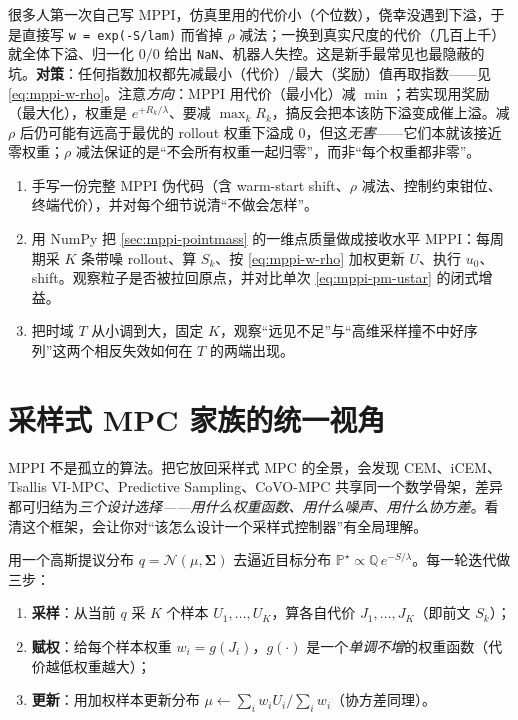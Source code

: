\begin{pitfall}
很多人第一次自己写 MPPI，仿真里用的代价小（个位数），侥幸没遇到下溢，于是直接写 \texttt{w = exp(-S/\allowbreak lam)} 而省掉 $\rho$ 减法；一换到真实尺度的代价（几百上千）就全体下溢、归一化 $0/0$ 给出 \texttt{NaN}、机器人失控。这是新手最常见也最隐蔽的坑。\textbf{对策}：任何指数加权都先减最小（代价）/最大（奖励）值再取指数——见 \cref{eq:mppi-w-rho}。注意\emph{方向}：MPPI 用代价（最小化）减 $\min$；若实现用奖励（最大化），权重是 $e^{+R_k/\lambda}$、要减 $\max_k R_k$，搞反会把本该防下溢变成催上溢。减 $\rho$ 后仍可能有远高于最优的 rollout 权重下溢成 $0$，但这\emph{无害}——它们本就该接近零权重；$\rho$ 减法保证的是“不会所有权重一起归零”，而非“每个权重都非零”。
\end{pitfall}

\begin{practice}
\begin{enumerate}
  \item 手写一份完整 MPPI 伪代码（含 warm-start shift、$\rho$ 减法、控制约束钳位、终端代价），并对每个细节说清“不做会怎样”。
  \item 用 NumPy 把 \cref{sec:mppi-pointmass} 的一维点质量做成接收水平 MPPI：每周期采 $K$ 条带噪 rollout、算 $S_k$、按 \cref{eq:mppi-w-rho} 加权更新 $U$、执行 $u_0$、shift。观察粒子是否被拉回原点，并对比单次 \cref{eq:mppi-pm-ustar} 的闭式增益。
  \item 把时域 $T$ 从小调到大，固定 $K$，观察“远见不足”与“高维采样撞不中好序列”这两个相反失效如何在 $T$ 的两端出现。
\end{enumerate}
\end{practice}

\section{采样式 MPC 家族的统一视角}
\label{sec:mppi-family}

MPPI 不是孤立的算法。把它放回采样式 MPC 的全景，会发现 CEM、iCEM、Tsallis VI-MPC、Predictive Sampling、CoVO-MPC 共享同一个数学骨架，差异都可归结为\emph{三个设计选择——用什么权重函数、用什么噪声、用什么协方差}。看清这个框架，会让你对“该怎么设计一个采样式控制器”有全局理解。

\begin{definition}\label{def:mppi-skeleton}
用一个高斯提议分布 $q=\mathcal{N}(\mu,\boldsymbol{\Sigma})$ 去逼近目标分布 $\mathbb{P}^\star\propto\mathbb{Q}\,e^{-S/\lambda}$。每一轮迭代做三步：
\begin{enumerate}
  \item \textbf{采样}：从当前 $q$ 采 $K$ 个样本 $U_1,\dots,U_K$，算各自代价 $J_1,\dots,J_K$（即前文 $S_k$）；
  \item \textbf{赋权}：给每个样本权重 $w_i=g(J_i)$，$g(\cdot)$ 是一个\emph{单调不增}的权重函数（代价越低权重越大）；
  \item \textbf{更新}：用加权样本更新分布 $\mu\leftarrow\sum_i w_i U_i/\sum_i w_i$（协方差同理）。
\end{enumerate}
\end{definition}

